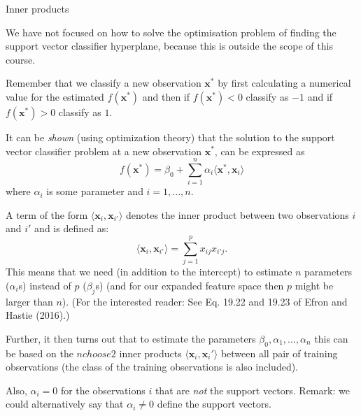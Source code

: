 \documentclass[10pt,ignorenonframetext,]{beamer}
\begin{document}
\begin{frame}

\begin{block}{Inner products}

We have not focused on how to solve the optimisation problem of finding
the support vector classifier hyperplane, because this is outside the
scope of this course.

Remember that we classify a new observation \({\boldsymbol x}^*\) by
first calculating a numerical value for the estimated
\(f({\boldsymbol x}^*)\) and then if \(f({\boldsymbol x}^*)<0\) classify
as \(-1\) and if \(f({\boldsymbol x}^*)>0\) classify as \(1\).

It can be \emph{shown} (using optimization theory) that the solution to
the support vector classifier problem at a new observation
\({\boldsymbol x}^*\), can be expressed as \[
f({\boldsymbol x}^*)=\beta_0 + \sum_{i=1}^n \alpha_i \langle {\boldsymbol x}^*,{\boldsymbol x}_i \rangle
\] where \(\alpha_i\) is some parameter and \(i=1,...,n\).

\end{block}

\end{frame}

\begin{frame}

A term of the form
\(\langle {\boldsymbol x}_i, {\boldsymbol x}_{i'} \rangle\) denotes the
inner product between two observations \(i\) and \(i'\) and is defined
as: \[
\langle {\boldsymbol x}_i , {\boldsymbol x}_{i'}\rangle =\sum_{j=1}^p x_{ij} x_{i' j}.
\] This means that we need (in addition to the intercept) to estimate
\(n\) parameters (\(\alpha_i\)s) instead of \(p\) (\(\beta_j\)s) (and
for our expanded feature space then \(p\) might be larger than \(n\)).
(For the interested reader: See Eq. 19.22 and 19.23 of Efron and Hastie
(2016).)

\end{frame}

\begin{frame}

Further, it then turns out that to estimate the parameters
\(\beta_0,\alpha_1,...,\alpha_n\) this can be based on the
\({n choose 2}\) inner products
\(\langle {\boldsymbol x}_i,{\boldsymbol x}_i' \rangle\) between all
pair of training observations (the class of the training observations is
also included).

Also, \(\alpha_i=0\) for the observations \(i\) that are \emph{not} the
support vectors. Remark: we could alternatively say that
\(\alpha_i \neq 0\) define the support vectors.

\end{frame}
\end{document}

